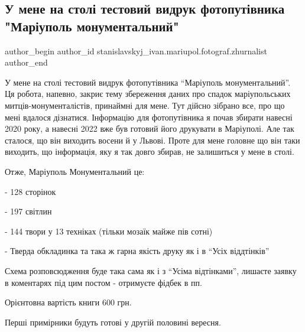  
 
 
 
 

\subsection{У мене на столі тестовий видрук фотопутівника "Маріуполь монументальний"}
\label{sec:29_08_2022.fb.stanislavskyj_ivan.mariupol.fotograf.zhurnalist.1.u_mene_na_stol__test}

\ifcmt
 author_begin
   author_id stanislavskyj_ivan.mariupol.fotograf.zhurnalist
 author_end
\fi

У мене на столі тестовий видрук фотопутівника \enquote{Маріуполь монументальний}. Ця
робота, напевно, закриє тему збереження даних про спадок маріупольських
митців-монументалістів, принаймні для мене. Тут дійсно зібрано все, про що мені
вдалося дізнатися. Інформацію для фотопутівника я почав збирати навесні 2020
року, а навесні 2022 вже був готовий його друкувати в Маріуполі. Але так
сталося, що він виходить восени й у Львові. Проте для мене головне що він таки
виходить, що інформація, яку я так довго збирав, не залишиться у мене в столі.

Отже, Маріуполь Монументальний це:

- 128 сторінок

- 197 світлин

- 144 твори у 13 техніках (тільки мозаїк майже пів сотні)

- Тверда обкладинка та така ж гарна якість друку як і в \enquote{Усіх віддтінків}

Схема розповсюдження буде така сама як і з \enquote{Усіма відтінками}, лишаєте заявку в
коментарях під цим постом - отримуєте фідбек в пп.

Орієнтовна вартість книги 600 грн.

Перші примірники будуть готові у другій половині вересня.
